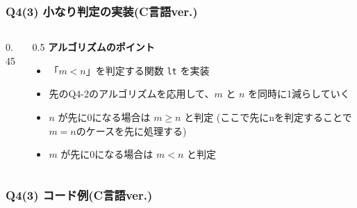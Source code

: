 \begin{frame}[fragile]
\frametitle{Q4(3) 小なり判定の実装(C言語ver.)}
    \begin{columns}[c]
        
        \begin{column}{0.45\textwidth}
            
        \end{column}
        
        \begin{column}{0.5\textwidth}
            \small
            \textbf{アルゴリズムのポイント}
            \begin{itemize}
                \item 「$m < n$」を判定する関数 \texttt{lt} を実装
                \item 先のQ4-2のアルゴリズムを応用して、$m$ と $n$ を同時に1減らしていく
                \item $n$ が先に0になる場合は $m \ge n$ と判定
                (ここで先にnを判定することで$m=n$のケースを先に処理する)
                \item $m$ が先に0になる場合は $m < n$ と判定
            \end{itemize}
        \end{column}       
    \end{columns}
\end{frame}

\begin{frame}[fragile]
\frametitle{Q4(3) コード例(C言語ver.)}
    
\end{frame}

